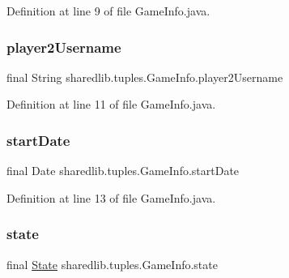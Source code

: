 Definition at line 9 of file Game\+Info.\+java.

\hypertarget{classsharedlib_1_1tuples_1_1_game_info_ad5af3fd8e58b7bdb34326ec50accf0e6}{}\label{classsharedlib_1_1tuples_1_1_game_info_ad5af3fd8e58b7bdb34326ec50accf0e6} 
\subsubsection{\texorpdfstring{player2\+Username}{player2Username}}
{\footnotesize\ttfamily final String sharedlib.\+tuples.\+Game\+Info.\+player2\+Username}



Definition at line 11 of file Game\+Info.\+java.

\hypertarget{classsharedlib_1_1tuples_1_1_game_info_abb7d07e4ce3a419b45134234b312d4a3}{}\label{classsharedlib_1_1tuples_1_1_game_info_abb7d07e4ce3a419b45134234b312d4a3} 
\subsubsection{\texorpdfstring{start\+Date}{startDate}}
{\footnotesize\ttfamily final Date sharedlib.\+tuples.\+Game\+Info.\+start\+Date}



Definition at line 13 of file Game\+Info.\+java.

\hypertarget{classsharedlib_1_1tuples_1_1_game_info_afc333badb334883013fd65eeb7d4fd80}{}\label{classsharedlib_1_1tuples_1_1_game_info_afc333badb334883013fd65eeb7d4fd80} 
\subsubsection{\texorpdfstring{state}{state}}
{\footnotesize\ttfamily final \hyperlink{enumsharedlib_1_1tuples_1_1_game_info_1_1_state}{State} sharedlib.\+tuples.\+Game\+Info.\+state}



